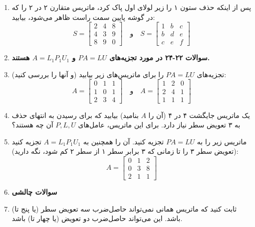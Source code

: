 \documentclass[12pt, a4paper]{book}
\begin{document}
\begin{enumerate}
		\item پس از اینکه حذف ستون ۱ را زیر لولای اول پاک کرد، ماتریس متقارن ۲ در ۲ را که در گوشه پایین سمت راست ظاهر می‌شود، بیابید:
		\[ S = \begin{bmatrix} 2 & 4 & 8 \\ 4 & 3 & 9 \\ 8 & 9 & 0 \end{bmatrix} \quad \text{و} \quad S = \begin{bmatrix} 1 & b & c \\ b & d & e \\ c & e & f \end{bmatrix} \]
		
		\item[] \textbf{سوالات ۲۲-۲۴ در مورد تجزیه‌های $PA=LU$ و $A=L_1P_1U_1$ هستند.}
		\item تجزیه‌های $PA=LU$ را برای ماتریس‌های زیر بیابید (و آنها را بررسی کنید):
		\[ A = \begin{bmatrix} 0 & 1 & 1 \\ 1 & 0 & 1 \\ 2 & 3 & 4 \end{bmatrix} \quad \text{و} \quad A = \begin{bmatrix} 1 & 2 & 0 \\ 2 & 4 & 1 \\ 1 & 1 & 1 \end{bmatrix} \]
		
		\item یک ماتریس جایگشت ۴ در ۴ (آن را $A$ بنامید) بیابید که برای رسیدن به انتهای حذف به ۳ تعویض سطر نیاز دارد. برای این ماتریس، عامل‌های $P, L, U$ آن چه هستند؟
		
		\item ماتریس زیر را به $PA=LU$ تجزیه کنید. آن را همچنین به $A=L_1P_1U_1$ تجزیه کنید (تعویض سطر ۳ را تا زمانی که ۳ برابر سطر ۱ از سطر ۲ کم شود، نگه دارید):
		\[ A = \begin{bmatrix} 0 & 1 & 2 \\ 0 & 3 & 8 \\ 2 & 1 & 1 \end{bmatrix} \]
		
		\item[] \textbf{سوالات چالشی}
		
		\item ثابت کنید که ماتریس همانی نمی‌تواند حاصل‌ضرب سه تعویض سطر (یا پنج تا) باشد. این می‌تواند حاصل‌ضرب دو تعویض (یا چهار تا) باشد.
		

\end{enumerate}
\end{document}
